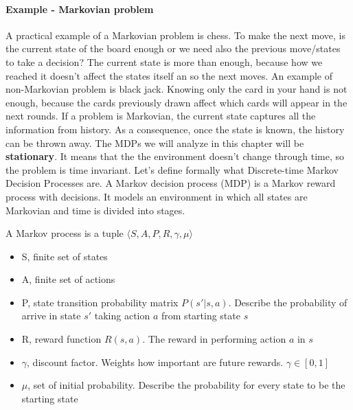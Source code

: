 \documentclass[../main.tex]{subfiles}
\begin{document}
\paragraph{Example - Markovian problem} A practical example of a Markovian problem is chess. To make the next move, is the current state of the board enough or we need also the previous move/states to take a decision? The current state is more than enough, because how we reached it doesn't affect the states itself an so the next moves. An example of non-Markovian problem is black jack. Knowing only the card in your hand is not enough, because the cards previously drawn affect which cards will appear in the next rounds.
\newline
\newline
If a problem is Markovian, the current state captures all the information from history. As a consequence, once the state is known, the history can be thrown away. The MDPs we will analyze in this chapter will be \textbf{stationary}\footnotemark. It means that the the environment doesn't change through time, so the problem is time invariant.
\newline
Let's define formally what Discrete-time Markov Decision Processes are.
A Markov decision process (MDP) is a Markov reward process with decisions. It models an environment in which all states are Markovian and time is divided into stages.
\newpage
\begin{definition}
    A Markov process is a tuple $\langle S, A, P, R, \gamma, \mu \rangle$
    \begin{itemize}
        \item S, finite set of states
        \item A, finite set of actions
        \item P, state transition probability matrix $P(s'|s,a)$. Describe the probability of arrive in state $s'$ taking action $a$ from starting state $s$
        \item R, reward function $R(s,a)$. The reward in performing action $a$ in $s$
        \item $\gamma$, discount factor. Weights how important are future rewards. $\gamma \in [0,1]$
        \item $\mu$, set of initial probability. Describe the probability for every state to be the starting state
    \end{itemize}
\end{definition}
\end{document}
